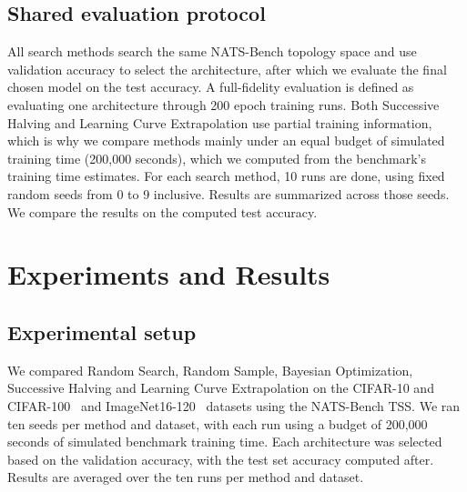 \documentclass[12pt]{article}
\begin{document}
\subsection{Shared evaluation protocol}
All search methods search the same NATS-Bench topology space and use validation accuracy to select the architecture, after which we evaluate the final chosen model on the test accuracy. A full-fidelity evaluation is defined as evaluating one architecture through 200 epoch training runs. Both Successive Halving and Learning Curve Extrapolation use partial training information, which is why we compare methods mainly under an equal budget of simulated training time (200,000 seconds), which we computed from the benchmark's training time estimates. For each search method, 10 runs are done, using fixed random seeds from 0 to 9 inclusive. Results are summarized across those seeds. We compare the results on the computed test accuracy.

\section{Experiments and Results}
\subsection{Experimental setup}
We compared Random Search, Random Sample, Bayesian Optimization, Successive Halving and Learning Curve Extrapolation on the CIFAR-10 and CIFAR-100~\cite{krizhevsky2009learning} and ImageNet16-120~\cite{DenDon09Imagenet} datasets using the NATS-Bench TSS. We ran ten seeds per method and dataset, with each run using a budget of 200,000 seconds of simulated benchmark training time. Each architecture was selected based on the validation accuracy, with the test set accuracy computed after. Results are averaged over the ten runs per method and dataset.
\end{document}
